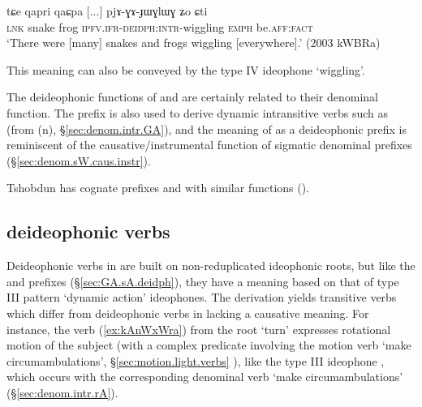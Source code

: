 \begin{exe}
\ex \label{ex:pjAGAJWGLWG}
\gll   tɕe qapri qaɕpa [...] pjɤ-ɣɤ-ɟɯɣlɯɣ ʑo ɕti \\
\textsc{lnk} snake frog { } \textsc{ipfv}.\textsc{ifr}-\textsc{deidph}:\textsc{intr}-wiggling \textsc{emph} be.\textsc{aff}:\textsc{fact} \\
\glt `There were [many] snakes and frogs wiggling [everywhere].' (2003 kWBRa)
\end{exe}


This meaning can also be conveyed by the type IV ideophone  `wiggling'.


The deideophonic functions of  and  are certainly related to their denominal function. The prefix  is also used to derive dynamic intransitive verbs such as  (from  (n), §\ref{sec:denom.intr.GA}), and the meaning of  as a deideophonic prefix is reminiscent of the causative/instrumental function of sigmatic denominal prefixes (§\ref{sec:denom.sW.caus.instr}).

Tshobdun has cognate prefixes  and  with similar functions (\citealt{jackson04zhuangmaoci, jackson14morpho}).

\subsection{ deideophonic verbs} \label{sec:nW.deidph}
Deideophonic verbs in  are built on non-reduplicated ideophonic roots, but like the  and  prefixes (§\ref{sec:GA.sA.deidph}), they have a meaning based on that of type III pattern `dynamic action' ideophones. The  derivation yields  transitive verbs which differ from  deideophonic verbs in lacking a causative meaning. For instance, the verb  (\ref{ex:kAnWxWra}) from the root  `turn' expresses rotational motion of the subject (with a complex predicate involving the motion verb  `make circumambulations', §\ref{sec:motion.light.verbs}
), like the type III ideophone , which occurs with the corresponding denominal verb  `make circumambulations' (§\ref{sec:denom.intr.rA}).

